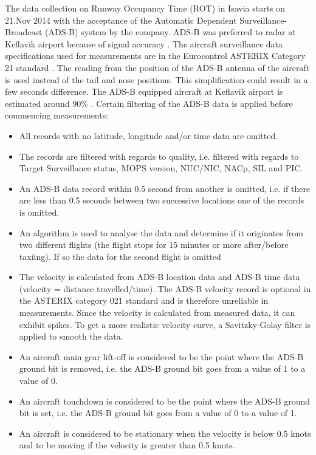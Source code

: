 The data collection on Runway Occupancy Time (ROT) in Isavia starts on 21.Nov 2014 with the acceptance of the Automatic Dependent Surveillance-Broadcast (ADS-B) system by the company. ADS-B was preferred to radar at Keflavik airport because of signal accuracy \cite{isavia_wiki}. The aircraft surveillance data specifications used for measurements are in the Eurocontrol ASTERIX Category 21 standard \cite{ASTERIX_ADS-B_specs}.
The reading from the position of the ADS-B antenna of the aircraft is used instead of the tail and nose positions. This simplification could result in a few seconds difference. The ADS-B equipped aircraft at Keflavik airport is estimated around $90\%$ \cite{isavia-rounardeild_rannsoknir_2018}.  Certain filtering of the ADS-B data is applied before commencing measurements: 
\begin{itemize}
    \item All records with no latitude, longitude and/or time data are omitted.
    \item The records are filtered with regards to quality, i.e. filtered with regards to Target Surveillance status, MOPS version, NUC/NIC, NACp, SIL and PIC.
    \item An ADS-B data record within 0.5 second from another is omitted, i.e. if there are less than 0.5 seconds between two successive locations one of the records is omitted.
    \item An algorithm is used to analyse the data and determine if it originates from two different flights (the flight stops for 15 minutes or more after/before taxiing). If so the data for the second flight is omitted
    \item The velocity is calculated from ADS-B location data and ADS-B time data (velocity = distance travelled/time). The ADS-B velocity record is optional in the ASTERIX category 021 standard and is therefore unreliable in measurements. Since the velocity is calculated from measured data, it can exhibit spikes. To get a more realistic velocity curve, a Savitzky-Golay filter is applied to smooth the data.
    \item An aircraft main gear lift-off is considered to be the point where the ADS-B ground bit is removed, i.e. the ADS-B ground bit goes from a value of 1 to a value of 0.
    \item An aircraft touchdown is considered to be the point where the ADS-B ground bit is set, i.e. the ADS-B ground bit goes from a value of 0 to a value of 1.
    \item An aircraft is considered to be stationary when the velocity is below 0.5 knots and to be moving if the velocity is greater than 0.5 knots.
    \cite{isavia_wiki}
\end{itemize}


